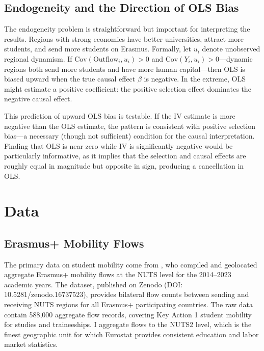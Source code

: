\documentclass[12pt]{article}
\begin{document}
\subsection{Endogeneity and the Direction of OLS Bias}

The endogeneity problem is straightforward but important for interpreting the results. Regions with strong economies have better universities, attract more students, and send more students on Erasmus. Formally, let $u_i$ denote unobserved regional dynamism. If $\text{Cov}(\text{Outflow}_i, u_i) > 0$ and $\text{Cov}(Y_i, u_i) > 0$---dynamic regions both send more students and have more human capital---then OLS is biased upward when the true causal effect $\beta$ is negative. In the extreme, OLS might estimate a positive coefficient: the positive selection effect dominates the negative causal effect.

This prediction of upward OLS bias is testable. If the IV estimate is more negative than the OLS estimate, the pattern is consistent with positive selection bias---a necessary (though not sufficient) condition for the causal interpretation. Finding that OLS is near zero while IV is significantly negative would be particularly informative, as it implies that the selection and causal effects are roughly equal in magnitude but opposite in sign, producing a cancellation in OLS.


\section{Data}
\label{sec:data}

\subsection{Erasmus+ Mobility Flows}

The primary data on student mobility come from \citet{vaisanen_2025}, who compiled and geolocated aggregate Erasmus+ mobility flows at the NUTS level for the 2014--2023 academic years. The dataset, published on Zenodo (DOI: 10.5281/zenodo.16737523), provides bilateral flow counts between sending and receiving NUTS regions for all Erasmus+ participating countries. The raw data contain 588,000 aggregate flow records, covering Key Action 1 student mobility for studies and traineeships. I aggregate flows to the NUTS2 level, which is the finest geographic unit for which Eurostat provides consistent education and labor market statistics.
\end{document}
